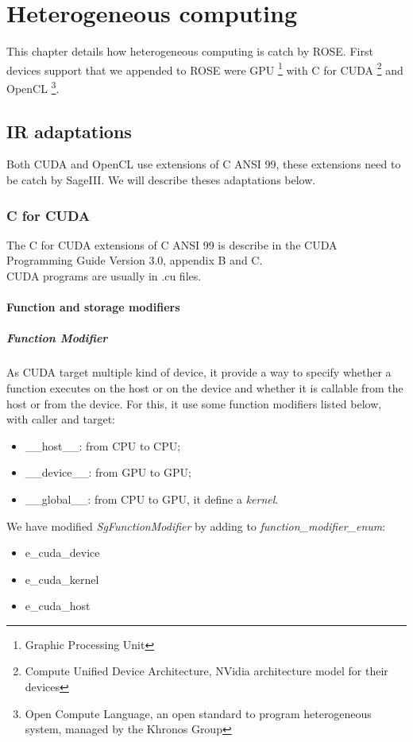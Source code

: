 \chapter{Heterogeneous computing}

\label{heterogeneous:heterogeneous}

This chapter details how heterogeneous computing is catch by ROSE. First devices support that we appended to ROSE were GPU \footnote{Graphic Processing Unit}
with C for CUDA \footnote{Compute Unified Device Architecture, NVidia architecture model for their devices} and OpenCL \footnote{Open Compute Language,
an open standard to program heterogeneous system, managed by the Khronos Group}.

	\section{IR adaptations}
	
		Both CUDA and OpenCL use extensions of C ANSI 99, these extensions need to be catch by SageIII. We will describe theses adaptations below.

		\subsection{C for CUDA}
		
			The C for CUDA extensions of C ANSI 99 is describe in the CUDA Programming Guide Version 3.0, appendix B and C.\\
			CUDA programs are usually in .cu files.
		
			\subsubsection{Function and storage modifiers}

				\paragraph{Function Modifier}

As CUDA target multiple kind of device, it provide a way to specify whether a function executes on the host or on the device and whether it is
callable from the host or from the device. For this, it use some function modifiers listed below, with caller and target:
\begin{itemize}
	\item \_\_host\_\_: from CPU to CPU;
	\item \_\_device\_\_: from GPU to GPU;
	\item \_\_global\_\_: from CPU to GPU, it define a \emph{kernel}.
\end{itemize}
We have modified \emph{SgFunctionModifier} by adding to \emph{function\_modifier\_enum}:
\begin{itemize}
	\item e\_cuda\_device
	\item e\_cuda\_kernel
	\item e\_cuda\_host
\end{itemize}

